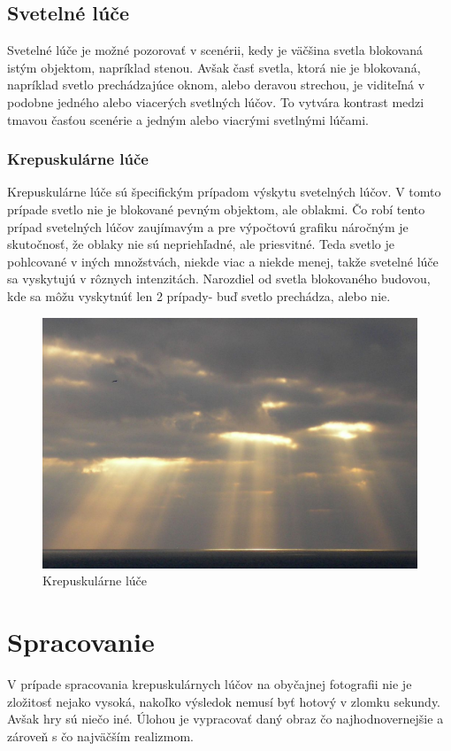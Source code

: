 \documentclass[10pt,twoside,slovak,a4paper]{article}
\begin{document}
\subsection{Svetelné lúče} \label{se:luce}
Svetelné lúče je možné pozorovať v scenérii, kedy je väčšina svetla blokovaná istým 
objektom, napríklad stenou. Avšak časť svetla, ktorá nie je blokovaná, napríklad svetlo 
prechádzajúce oknom, alebo deravou strechou, je viditeľná v podobne jedného alebo viacerých 
svetlných lúčov. To vytvára kontrast medzi tmavou časťou scenérie a jedným alebo viacrými 
svetlnými lúčami.

\subsubsection{Krepuskulárne lúče} \label{se:luce:kl}
Krepuskulárne lúče sú špecifickým prípadom výskytu svetelných lúčov. V tomto prípade 
svetlo nie je blokované pevným objektom, ale oblakmi. Čo robí tento prípad svetelných 
lúčov zaujímavým a pre výpočtovú grafiku náročným je skutočnosť, že oblaky nie sú 
nepriehľadné, ale priesvitné. Teda svetlo je pohlcované v iných množstvách, niekde 
viac a niekde menej, takže svetelné lúče sa vyskytujú v rôznych intenzitách. Narozdiel 
od svetla blokovaného budovou, kde sa môžu vyskytnúť len 2 prípady- buď svetlo prechádza, 
alebo nie.

\begin{figure}[h]
    \centering
    \includegraphics[scale=0.2]{god_ray.jpg}
    \caption{Krepuskulárne lúče}
    \label{fig:kl}
\end{figure}

\section{Spracovanie} \label{spracovanie}
V prípade spracovania krepuskulárnych lúčov na obyčajnej fotografii nie je zložitosť 
nejako vysoká, nakoľko výsledok nemusí byť hotový v zlomku sekundy. Avšak hry sú niečo 
iné. Úlohou je vypracovať daný obraz čo najhodnovernejšie a zároveň s čo najväčším 
realizmom.
\end{document}
